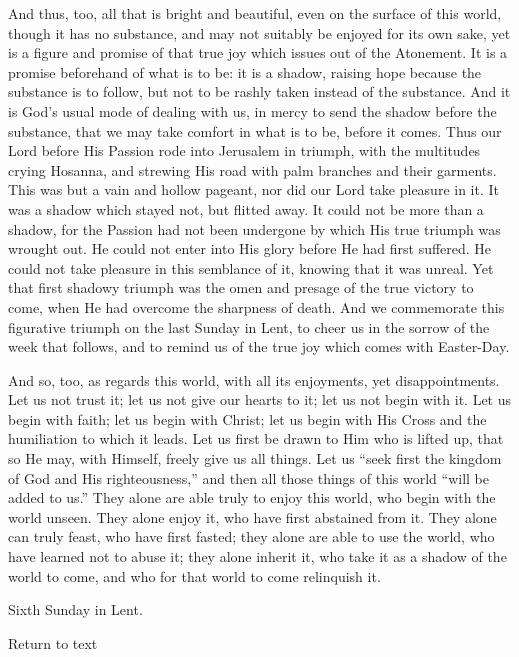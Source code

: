 And thus, too, all that is bright and beautiful, even
on the surface of this world, though it has no substance,
and may not suitably be enjoyed for its own sake, yet is
a figure and promise of that true joy which issues out of
the Atonement. It is a promise beforehand of what is to
be: it is a shadow, raising hope because the substance is
to follow, but not to be rashly taken instead of the
substance. And it is God's usual mode of dealing with us,
in mercy to send the shadow before the substance, that we
may take comfort in what is to be, before it comes. Thus
our Lord before His Passion rode into Jerusalem in
triumph, with the multitudes crying Hosanna, and strewing
His road with palm branches and their garments. This was
but a vain and hollow pageant, nor did our Lord take
pleasure in it. It was a shadow which stayed not, but
flitted away. It could not be more than a shadow, for the
Passion had not been undergone by which His true triumph
was wrought out. He could not enter into His glory before
He had first suffered. He could not take pleasure in this
semblance of it, knowing that it was unreal. Yet that
first shadowy triumph was the omen and presage of the
true victory to come, when He had overcome the sharpness
of death. And we commemorate this figurative triumph on
the last Sunday in Lent, to cheer us in the sorrow of the
week that follows, and to remind us of the true joy which
comes with Easter-Day.

And so, too, as regards this world, with all its
enjoyments, yet disappointments. Let us not trust it; let us not give our hearts to it; let us not begin with it.
Let us begin with faith; let us begin with Christ; let us
begin with His Cross and the humiliation to which it
leads. Let us first be drawn to Him who is lifted up,
that so He may, with Himself, freely give us all things.
Let us ``seek first the kingdom of God and His
righteousness,'' and then all those things of this
world ``will be added to us.'' They alone are
able truly to enjoy this world, who begin with the world
unseen. They alone enjoy it, who have first abstained
from it. They alone can truly feast, who have first
fasted; they alone are able to use the world, who have
learned not to abuse it; they alone inherit it, who take
it as a shadow of the world to come, and who for that
world to come relinquish it.


Sixth Sunday in Lent.

Return to text


